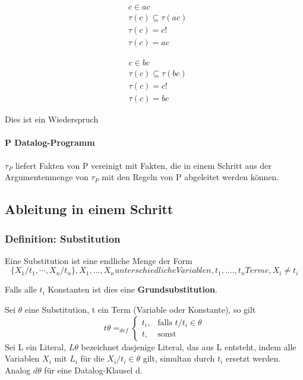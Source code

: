 \documentclass[12pt, a4paper]{article}
\begin{document}
\begin{equation}
\begin{split}
&c \in ac \\
&\tau(c) \subseteq \tau(ac) \\
&\tau(c) = c ! \\ %
&\tau(c) = ac
\end{split}
\end{equation}

\begin{equation}
\begin{split}
&c \in bc \\
&\tau(c) \subseteq \tau(bc) \\
&\tau(c) = c ! \\ %
&\tau(c) = bc
\end{split}
\end{equation}

Dies ist ein Wiederspruch


\paragraph{P Datalog-Programm}
$\tau_P$ liefert Fakten von P vereinigt mit Fakten, die in einem Schritt aus der Argumentenmenge von $\tau_P$ mit den Regeln von P abgeleitet werden können.

\subsection{Ableitung in einem Schritt}

\subsubsection{Definition: Substitution}
Eine Substitution ist eine endliche Menge der Form
\begin{equation}
\{ X_1 / t_1, \cdots, X_n / t_n \}, X_1,...,X_n unterschiedliche Variablen, t_1,....,t_n Terme, X_i \neq t_i
\end{equation}

Falls alle $t_i$ Konstanten ist dies eine \textbf{Grundsubstitution}.

Sei $\theta$ eine Substitution, t ein Term (Variable oder Konstante), so gilt \\

\begin{equation}
t\theta =_{def} \begin{cases} t_i, & \mbox{falls } t/t_i \in \theta \\ t, & \mbox{sonst} \end{cases}
\end{equation}
Sei L ein Literal, $L\theta$ bezeichnet dasjenige Literal, das aus L entsteht, indem alle Variablen $X_i$ mit $L_i$ für die $X_i / t_i \in \theta$ gilt, simultan durch $t_i$ ersetzt werden. Analog $d\theta$ für eine Datalog-Klausel d.
\end{document}
